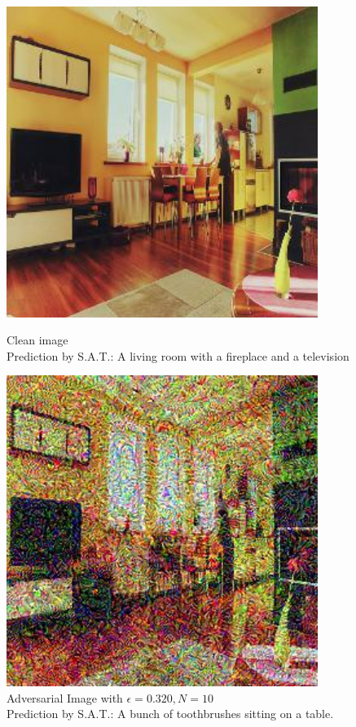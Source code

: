 \begin{figure}[ht]
    \centering
    \begin{minipage}{0.45\textwidth}
        \centering
        \includegraphics[width=0.9\textwidth]{../code/ShowDistractAndDeceive/samples/0.000/img_0.jpg} %
        \caption*{Clean image\\Prediction by S.A.T.: A living room with a fireplace and a television}
    \end{minipage}\hfill
    \begin{minipage}{0.45\textwidth}
        \centering
        \includegraphics[width=0.9\textwidth]{../code/ShowDistractAndDeceive/samples/0.640/img_0.jpg} %
        \caption*{Adversarial Image with $\epsilon=0.320, N=10$\\Prediction by S.A.T.: A bunch of toothbrushes sitting on a table.}
    \end{minipage}
\end{figure}